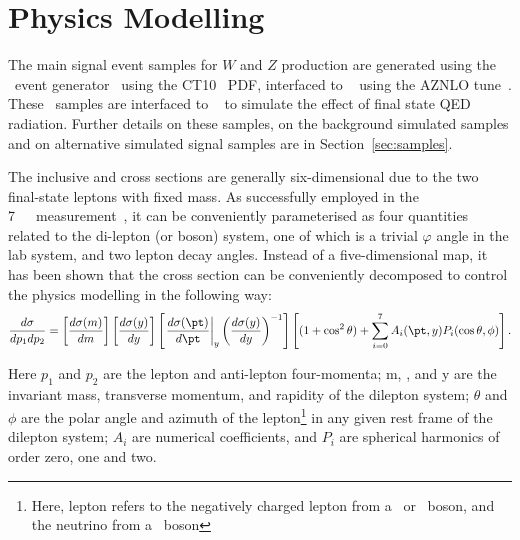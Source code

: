 \chapter{Physics Modelling}
\label{sec:modelingCorr}


The main signal event samples for $W$ and $Z$ production are generated
using the \POWHEG\ event
generator~\cite{Nason:2004rx,Frixione:2007vw,Alioli:2010xd,Alioli:2008gx}
using the CT10~\cite{Lai:2010vv} PDF, interfaced to \PYTHIA[8]~\cite{Sjostrand:2007gs} using the
AZNLO tune~\cite{STDM-2012-23}. These \PowPythia\ samples are interfaced
to \Photos~\cite{Golonka:2005pn} to simulate the effect of final state
QED radiation. Further details on these samples, on the background simulated samples and on alternative simulated signal samples are in Section~\ref{sec:samples}.

The inclusive \Zll and \Wlnu cross sections are generally
six-dimensional due to the two final-state leptons with fixed mass. As
successfully employed in the 7~\TeV\ \mW\
measurement~\cite{STDM-2014-18,Andari:1966965}, it can be conveniently parameterised
as four quantities related to the di-lepton (or boson) system, one of
which is a trivial $\varphi$ angle in the lab system, and two lepton
decay angles. Instead of a five-dimensional map, it has been shown
that the cross section can be conveniently decomposed to control the
physics modelling in the following way:
\begin{equation}
\label{eqn:master_formula}
\frac{d\sigma}{dp_1 dp_2}=\left\lbrack \frac{d\sigma(m)}{dm} \right\rbrack\left\lbrack \frac{d\sigma(y)}{dy} \right\rbrack\left\lbrack \left.\frac{ d\sigma(\pt)}{d\pt} \right|_y \left(\frac{d\sigma(y)}{dy}\right)^{-1}\right\rbrack \left\lbrack (1+\cos^2\theta) + \sum_{i=0}^7 A_i(\pt,y)P_i(\cos\theta,\phi) \right\rbrack.
\end{equation}

Here $p_1$ and $p_2$ are the lepton and anti-lepton four-momenta; m,
\pt, and y are the invariant mass, transverse momentum, and rapidity
of the dilepton system; $\theta$ and $\phi$ are the polar angle and
azimuth of the lepton\footnote{Here, lepton refers to the negatively
  charged lepton from a \Wminus\ or \Zboson\ boson, and the neutrino
  from a \Wplus\ boson} in any given rest frame of the dilepton
system; $A_i$ are numerical coefficients, and $P_i$ are spherical
harmonics of order zero, one and two.

